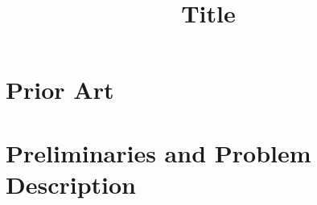 \documentclass[letterpaper, 10 pt, conference]{ieeeconf}
\title{\LARGE \bf
Title
}
\begin{document}


\maketitle
\thispagestyle{empty}
\pagestyle{empty}






% 

\section{Prior Art}
\label{sec:prior}


\section{Preliminaries and Problem Description} 
\label{sec:prelim}



% 
\end{document}

